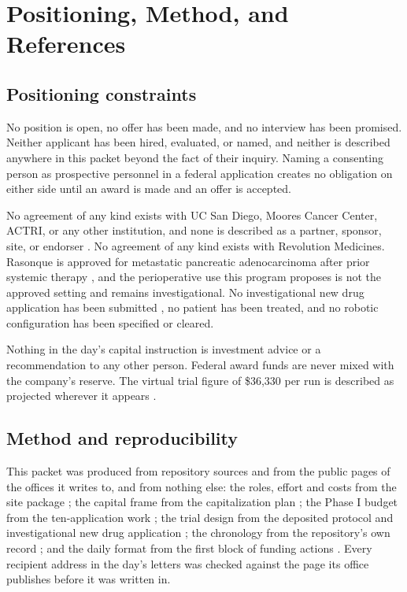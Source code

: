 \section{Positioning, Method, and References}

\subsection{Positioning constraints}

No position is open, no offer has been made, and no interview has been
promised. Neither applicant has been hired, evaluated, or named, and neither is
described anywhere in this packet beyond the fact of their inquiry. Naming a
consenting person as prospective personnel in a federal application creates no
obligation on either side until an award is made and an offer is accepted.

No agreement of any kind exists with UC San Diego, Moores Cancer Center, ACTRI,
or any other institution, and none is described as a partner, sponsor, site, or
endorser \cite{ucsdmoorescto2026,ucsdactri2026}. No agreement of any kind exists
with Revolution Medicines. Rasonque is approved for metastatic pancreatic
adenocarcinoma after prior systemic therapy \cite{fdarasonque2026,fdadisco2026},
and the perioperative use this program proposes is not the approved setting and
remains investigational. No investigational new drug application has been
submitted \cite{ecfr2026part312}, no patient has been treated, and no robotic
configuration has been specified or cleared.

Nothing in the day's capital instruction is investment advice or a
recommendation to any other person. Federal award funds are never mixed with the
company's reserve. The virtual trial figure of \$36,330 per run is described as
projected wherever it appears \cite{capitalplan2026}.

\subsection{Method and reproducibility}

This packet was produced from repository sources and from the public pages of
the offices it writes to, and from nothing else: the roles, effort and costs from
the site package \cite{movein2026}; the capital frame from the capitalization
plan \cite{capitalplan2026}; the Phase I budget from the ten-application work
\cite{tenapps2026}; the trial design from the deposited protocol and
investigational new drug application \cite{onpremwhippl,phase1ind}; the
chronology from the repository's own record \cite{daraxstory2026}; and the daily
format from the first block of funding actions \cite{autofund2026}. Every
recipient address in the day's letters was checked against the page its office
publishes before it was written in.

